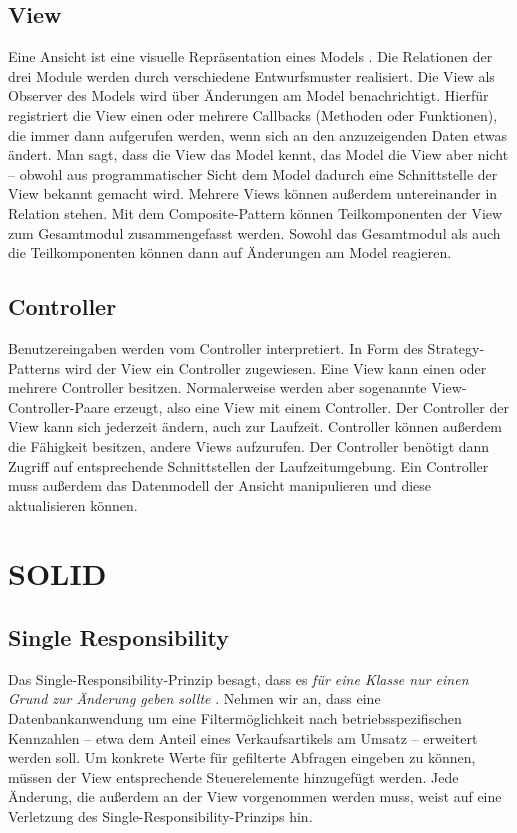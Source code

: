 \documentclass{vldb}
\begin{document}
\subsection{View}
Eine Ansicht ist eine visuelle Repräsentation eines Models \cite[S.~1]{Reens79-1}. Die Relationen der drei Module werden durch verschiedene Entwurfsmuster realisiert. Die View als Observer des Mo\-dels \cite[S.~293—305]{GoF94} wird über Änderungen am Model benachrichtigt. Hierfür registriert die View einen oder mehrere Callbacks (Methoden oder Funktionen), die immer dann aufgerufen werden, wenn sich an den anzuzeigenden Daten etwas ändert. Man sagt, dass die View das Model kennt, das Model die View aber nicht – obwohl aus pro\-gram\-ma\-ti\-scher Sicht dem Model dadurch eine Schnittstelle der View bekannt gemacht wird. Mehrere Views können außerdem untereinander in Relation stehen. Mit dem Composite-Pat\-tern \cite[S.~163—175]{GoF94} können Teilkomponenten der View zum Gesamtmodul zusammengefasst werden. Sowohl das Gesamtmodul als auch die Teilkomponenten können dann auf Än\-de\-run\-gen am Model reagieren.

\subsection{Controller}
\label{controllersec}
Benutzereingaben werden vom Controller interpretiert. In Form des Strategy-Patterns \cite[S.~315—325]{GoF94} wird der View ein Controller zugewiesen. Eine View kann einen oder meh\-re\-re Controller besitzen. Normalerweise werden aber sogenannte View-Controller-Paare erzeugt, also eine View mit einem Controller. Der Controller der View kann sich je\-der\-zeit ändern, auch zur Laufzeit. Controller können außerdem die Fähigkeit besitzen, andere Views aufzurufen. Der Controller benötigt dann Zugriff auf ent\-spre\-chen\-de Schnittstellen der Laufzeitumgebung. Ein Controller muss außerdem das Datenmodell der Ansicht ma\-ni\-pu\-lie\-ren und diese aktualisieren können. %

\section{SOLID}
\subsection{Single Responsibility}
\label{srpsec}
Das Single-Responsibility-Prinzip besagt, dass es \textit{für eine Klasse nur einen Grund zur Änderung geben sollte} \cite[S.~63]{Martin17}. Nehmen wir an, dass eine Datenbankanwendung um eine Filtermöglichkeit nach betriebsspezifischen Kennzahlen -- etwa dem Anteil eines Verkaufsartikels am Umsatz -- erweitert werden soll. Um konkrete Werte für gefilterte Abfragen eingeben zu können, müssen der View entsprechende Steu\-er\-e\-le\-men\-te hinzugefügt werden. Jede Änderung, die außerdem an der View vorgenommen werden muss, weist auf eine Verletzung des Single-Responsibility-Prinzips hin.
\end{document}
